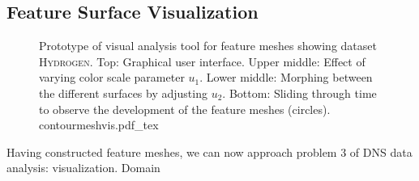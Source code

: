 \subsection{Feature Surface Visualization}
%
\begin{figure}[p]
    \begin{captionbeside}
    {Prototype of visual analysis tool for feature meshes showing dataset
	\textsc{Hydrogen}. Top: Graphical user interface. Upper middle: Effect of
	varying color scale parameter $u_1$. Lower middle: Morphing between the
	different surfaces  by adjusting $u_2$. Bottom: Sliding through time to
	observe the development of the feature meshes (circles).
	}
 	\def\svgwidth{0.6\linewidth}
		{contourmeshvis.pdf_tex}
    \end{captionbeside}
	\label{fig_contourmeshvis}
\end{figure}
%
Having constructed feature meshes, we can now approach problem 3 of \ac{DNS} data analysis: visualization. Domain
